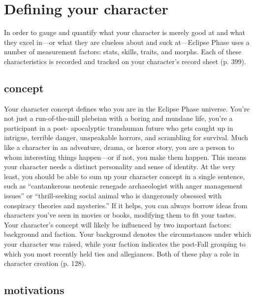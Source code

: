 \section{Defining your character}
\label{sec:defin-your-char}

In order to gauge and quantify what your character is merely good at and what they excel in—or what they are clueless about and suck at—Eclipse Phase uses a number of measurement factors: stats, skills, traits, and morphs. Each of these characteristics is recorded and tracked on your character's record sheet (p. 399).

\subsection{concept}
\label{sec:concept}

Your character concept defines who you are in the Eclipse Phase universe. You're not just a run-of-the-mill plebeian with a boring and mundane life, you're a participant in a post- apocalyptic transhuman future who gets caught up in intrigue, terrible danger, unspeakable horrors, and scrambling for survival. Much like a character in an adventure, drama, or horror story, you are a person to whom interesting things happen—or if not, you make them happen. This means your character needs a distinct personality and sense of identity. At the very least, you should be able to sum up your character concept in a single sentence, such as “cantankerous neotenic renegade archaeologist with anger management issues” or “thrill-seeking social animal who is dangerously obsessed with conspiracy theories and mysteries.” If it helps, you can always borrow ideas from characters you've seen in movies or books, modifying them to fit your tastes. Your character's concept will likely be influenced by two important factors: background and faction. Your background denotes the circumstances under which your character was raised, while your faction indicates the post-Fall grouping to which you most recently held ties and allegiances. Both of these play a role in character creation (p. 128).

\subsection{motivations}
\label{sec:motivations}

